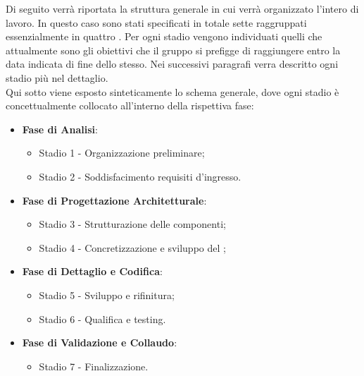 Di seguito verrà riportata la struttura generale in cui verrà organizzato l'intero  di lavoro. In questo caso sono stati specificati in totale sette  raggruppati essenzialmente in quattro . Per ogni stadio vengono individuati quelli che attualmente sono gli obiettivi che il gruppo \Gruppo{} si prefigge di raggiungere entro la data indicata di fine dello stesso. Nei successivi paragrafi verra descritto ogni stadio più nel dettaglio.\\
Qui sotto viene esposto sinteticamente lo schema generale, dove ogni stadio è concettualmente collocato all'interno della rispettiva fase:

\begin{itemize}
    \item \textbf{Fase di Analisi}:
    \begin{itemize}
        \item Stadio 1 - Organizzazione preliminare;
        \item Stadio 2 - Soddisfacimento requisiti d'ingresso.
    \end{itemize}

    \item \textbf{Fase di Progettazione Architetturale}:
    \begin{itemize}
        \item Stadio 3 - Strutturazione delle componenti;
        \item Stadio 4 - Concretizzazione e sviluppo del ;
    \end{itemize}

    \item \textbf{Fase di Dettaglio e Codifica}:
    \begin{itemize}  
        \item Stadio 5 - Sviluppo e rifinitura;
        \item Stadio 6 - Qualifica e testing.
    \end{itemize}

    \item \textbf{Fase di Validazione e Collaudo}:
    \begin{itemize}        
        \item Stadio 7 - Finalizzazione.
    \end{itemize}
\end{itemize}


